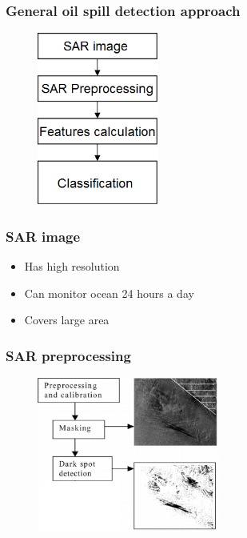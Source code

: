 \documentclass{beamer}
\begin{document}
\begin{frame}
\frametitle{General oil spill detection approach}
\begin{figure}
	\centering
    \includegraphics[width=40mm,scale=1]{./img/basicsteps.png}
\end{figure}



\end{frame}
\begin{frame}
\frametitle{SAR image}
\begin{itemize}
	\item Has high resolution
	\item Can monitor ocean 24 hours a day
	\item Covers large area 

\end{itemize}
\end{frame}
\begin{frame}
\frametitle{SAR preprocessing}
\begin{figure}
	\centering
    \includegraphics[width=60mm,scale=1]{./img/preprocessing_diagram.png}
\end{figure}
\end{frame}

\end{document}
